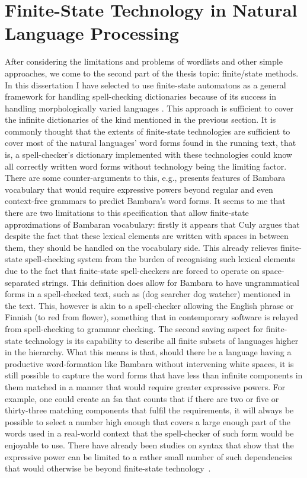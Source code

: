 \documentclass[officiallayout,final]{unihelcompling}
\newcommand\misspelt{\bgroup\markoverwith
{\lower3.5pt\hbox{\sixly \char58}}\ULon}
\newcommand\misspelt{\bgroup\markoverwith
{\textcolor{red}{\lower3.5pt\hbox{\sixly \char58}}}\ULon}
\begin{document}
\section{Finite-State Technology in Natural Language Processing}
\label{sec:finite-state-technology-in-nlp}

After considering the limitations and problems of wordlists and other simple
approaches, we come to the second part of the thesis topic: finite\-/state
methods. In this dissertation I have selected to use \glspl{finite-state
automaton} as a general framework for handling spell-checking dictionaries
because of its success in handling morphologically varied
languages \citep{beesley2003finite}. This approach is sufficient to cover
the infinite dictionaries of the kind mentioned in the previous section.  It is
commonly thought that the extents of finite-state technologies are sufficient
to cover most of the natural languages' word forms found in the running text,
that is, a spell-checker's dictionary implemented with these technologies could
know all correctly written word forms without technology being the limiting
factor. There are some counter-arguments to this, e.g.,
\citet{culy1987complexity} presents features of Bambara vocabulary that would
require expressive powers beyond regular and even context-free grammars to
predict Bambara's word forms. It seems to me that there are two limitations to
this specification that allow finite-state approximations of Bambaran
vocabulary: firstly it appears that Culy argues that despite the fact that
these lexical elements are written with spaces in between them, they should be
handled on the vocabulary side. This already relieves finite-state
spell-checking system from the burden of recognising such lexical elements due
to the fact that finite-state spell-checkers are forced to operate on
space-separated strings.  This definition does allow for Bambara to have
ungrammatical forms in a spell-checked text, such as \misspelt{\emph{wulunyina
o wulufilela}} (dog searcher dog watcher) mentioned in the text. This, however
is akin to a spell-checker allowing the English phrase \misspelt{\emph{I sees
he}} or Finnish \misspelt{\emph{punaiselle kukasta}} (to red from flower),
something that in contemporary software is relayed from spell-checking to
grammar checking. The second saving aspect for finite-state technology is its
capability to describe all finite subsets of languages higher in the hierarchy.
What this means is that, should there be a language having a productive
word-formation like Bambara without intervening white spaces, it is still
possible to capture the word forms that have less than infinite components in
them matched in a manner that would require greater expressive powers. For
example, one could create an \gls{fsa} that counts that if there are two or
five or thirty-three matching components that fulfil the requirements, it will
always be possible to select a number high enough that covers a large enough
part of the words used in a real-world context that the spell-checker of such
form would be enjoyable to use.  There have already been studies on syntax that
show that the expressive power can be limited to a rather small number of such
dependencies that would otherwise be beyond finite-state
technology~\citep{karlsson2007constraints}.
\end{document}
